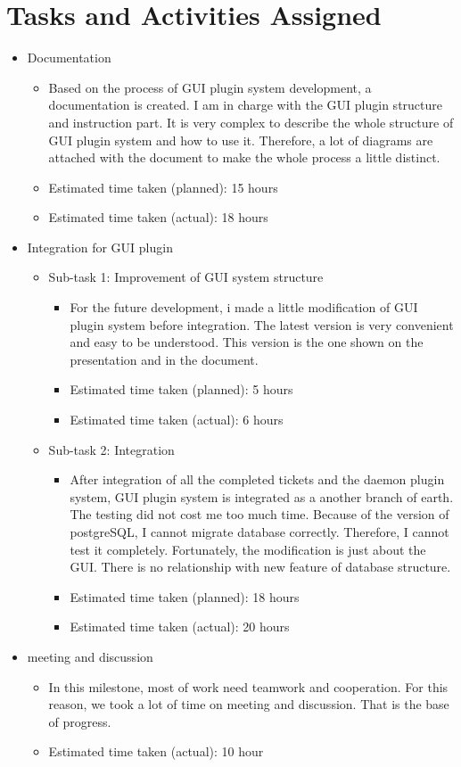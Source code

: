 \section*{Tasks and Activities Assigned}
\begin{itemize}
	\item Documentation
		\begin{itemize}
	        	\item Based on the process of GUI plugin system development, a documentation is created. I am in charge with the GUI plugin structure and instruction part. It is very complex to describe the whole structure of GUI plugin system and how to use it. Therefore, a lot of diagrams are attached with the document to make the whole process a little distinct.
			\item Estimated time taken (planned): 15 hours
			\item Estimated time taken (actual): 18 hours
		\end{itemize}			
	\item Integration for GUI plugin
	     \begin{itemize}
	         \item Sub-task 1: Improvement of GUI system structure
	            \begin{itemize}
			\item For the future development, i made a little modification of GUI plugin system before integration. The latest version is very convenient and easy to be understood. This version is the one shown on the presentation and in the document.
			\item Estimated time taken (planned): 5 hours
			\item Estimated time taken (actual): 6 hours
			\end{itemize}
	         \item Sub-task 2: Integration
	            \begin{itemize}
			\item After integration of all the completed tickets and the daemon plugin system, GUI plugin system is integrated as a another branch of earth. The testing did not cost me too much time. Because of the version of postgreSQL, I cannot migrate database correctly. Therefore, I cannot test it completely. Fortunately, the modification is just about the GUI. There is no relationship with new feature of database structure.
			\item Estimated time taken (planned): 18 hours
			\item Estimated time taken (actual): 20 hours
		\end{itemize}
	     \end{itemize}
	\item meeting and discussion
	     \begin{itemize}
	         \item In this milestone, most of work need teamwork and cooperation. For this reason, we took a lot of time on meeting and discussion. That is the base of progress.
	         \item Estimated time taken (actual): 10 hour
	     \end{itemize}
\end{itemize}

